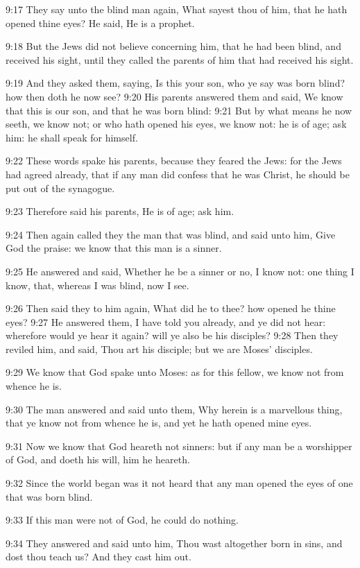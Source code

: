 9:17 They say unto the blind man again, What sayest thou of him, that
he hath opened thine eyes? He said, He is a prophet.

9:18 But the Jews did not believe concerning him, that he had been
blind, and received his sight, until they called the parents of him
that had received his sight.

9:19 And they asked them, saying, Is this your son, who ye say was
born blind? how then doth he now see?  9:20 His parents answered them
and said, We know that this is our son, and that he was born blind:
9:21 But by what means he now seeth, we know not; or who hath opened
his eyes, we know not: he is of age; ask him: he shall speak for
himself.

9:22 These words spake his parents, because they feared the Jews: for
the Jews had agreed already, that if any man did confess that he was
Christ, he should be put out of the synagogue.

9:23 Therefore said his parents, He is of age; ask him.

9:24 Then again called they the man that was blind, and said unto him,
Give God the praise: we know that this man is a sinner.

9:25 He answered and said, Whether he be a sinner or no, I know not:
one thing I know, that, whereas I was blind, now I see.

9:26 Then said they to him again, What did he to thee? how opened he
thine eyes?  9:27 He answered them, I have told you already, and ye
did not hear: wherefore would ye hear it again? will ye also be his
disciples?  9:28 Then they reviled him, and said, Thou art his
disciple; but we are Moses' disciples.

9:29 We know that God spake unto Moses: as for this fellow, we know
not from whence he is.

9:30 The man answered and said unto them, Why herein is a marvellous
thing, that ye know not from whence he is, and yet he hath opened mine
eyes.

9:31 Now we know that God heareth not sinners: but if any man be a
worshipper of God, and doeth his will, him he heareth.

9:32 Since the world began was it not heard that any man opened the
eyes of one that was born blind.

9:33 If this man were not of God, he could do nothing.

9:34 They answered and said unto him, Thou wast altogether born in
sins, and dost thou teach us? And they cast him out.

